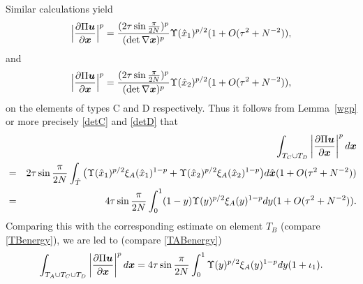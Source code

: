 \documentclass[12pt]{article}
\renewcommand{\vec}[1]{\mbox{\boldmath$#1$}}
\numberwithin{equation}{section}
\begin{document}
Similar calculations yield
$$
\Big|\frac{\partial \Pi \vec{u}}{\partial \vec{x}}\Big|^p=
\frac{(2\tau \sin{\frac{\pi}{2N}})^p}{(\det \nabla
\vec{x})^p}\Upsilon(\hat{x}_1)^{p/2}(1+O(\tau^2+N^{-2})),
$$
and
$$
\Big|\frac{\partial \Pi \vec{u}}{\partial \vec{x}}\Big|^p=
\frac{(2\tau \sin{\frac{\pi}{2N}})^p}{(\det \nabla
\vec{x})^p}\Upsilon(\hat{x}_2)^{p/2}(1+O(\tau^2+N^{-2})),$$
on the elements of types C and D respectively.
Thus it follows from Lemma~\ref{wgp} or more precisely  \eqref{detC} and
\eqref{detD} that
\begin{eqnarray*}
&&\int_{T_C\cup T_D}\left| \frac{\partial  \Pi\vec{u}}{\partial \vec{x}} \right|^p
d\vec{x}\\ &=&2\tau \sin{\frac{\pi}{2N}}\int_{\hat{T}}
\big(\Upsilon(\hat{x}_1)^{p/2}\xi_A(\hat{x}_1)^{1-p}+\Upsilon(\hat{x}_2)^{p/2}
\xi_A(\hat{x}_2)^{1-p}\big)d\hat{\vec{x}}(1+O(\tau^2+N^{-2}))\\
&=&4\tau \sin{\frac{\pi}{2N}}\int_0^1 (1-y)\Upsilon(y)^{p/2}\xi_A(y)^{1-p}
dy(1+O(\tau^2+N^{-2})).
\end{eqnarray*}
Comparing this with the corresponding estimate on element $T_B$ (compare \eqref{TBenergy}),
we are led to (compare \eqref{TABenergy})
\begin{equation}
\int_{T_A\cup T_C \cup T_D}\left| \frac{\partial \Pi \vec{u}}{\partial \vec{x}} \right|^p
d\vec{x}=4\tau \sin{\frac{\pi}{2N}}\int_0^1
\Upsilon(y)^{p/2}\xi_A(y)^{1-p}dy(1+\iota_1). \label{TACDenergy}
\end{equation}
\end{document}
